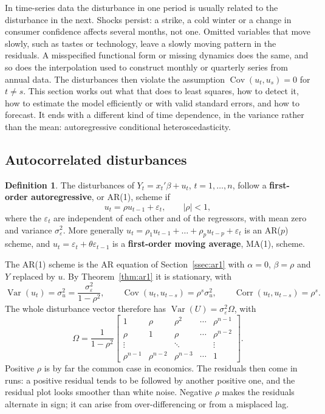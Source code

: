 \documentclass[11pt,a4paper]{article}
\numberwithin{equation}{section}
\DeclareMathOperator{\Var}{Var}
\DeclareMathOperator{\Cov}{Cov}
\DeclareMathOperator{\Corr}{Corr}
\theoremstyle{definition}
\newtheorem{defn}[thm]{Definition}
\begin{document}
In time-series data the disturbance in one period is usually related to the disturbance in the next. Shocks persist: a strike, a cold winter or a
change in consumer confidence affects several months, not one. Omitted variables that move slowly, such as tastes or technology, leave a slowly
moving pattern in the residuals. A misspecified functional form or missing dynamics does the same, and so does the interpolation used to construct
monthly or quarterly series from annual data. The disturbances then violate the assumption $\Cov(u_t, u_s) = 0$ for $t \neq s$. This section works out
what that does to least squares, how to detect it, how to estimate the model efficiently or with valid standard errors, and how to forecast. It
ends with a different kind of time dependence, in the variance rather than the mean: autoregressive conditional heteroscedasticity.

\subsection{Autocorrelated disturbances}
\label{ssec:acdist}

\begin{defn}
The disturbances of $Y_t = x_t'\beta + u_t$, $t = 1, \dots, n$, follow a \textbf{first-order autoregressive}, or AR(1), scheme if
\[
u_t = \rho u_{t-1} + \varepsilon_t, \qquad |\rho| < 1,
\]
where the $\varepsilon_t$ are independent of each other and of the regressors, with mean zero and variance $\sigma_\varepsilon^2$. More generally
$u_t = \rho_1u_{t-1} + \dots + \rho_pu_{t-p} + \varepsilon_t$ is an AR($p$) scheme, and $u_t = \varepsilon_t + \theta\varepsilon_{t-1}$ is a \textbf{first-order moving
average}, MA(1), scheme.
\end{defn}

The AR(1) scheme is the AR equation of Section~\ref{ssec:ar1} with $\alpha = 0$, $\beta = \rho$ and $Y$ replaced by $u$. By Theorem~\ref{thm:ar1} it is stationary,
with
\[
\Var(u_t) = \sigma_u^2 = \frac{\sigma_\varepsilon^2}{1 - \rho^2}, \qquad \Cov(u_t, u_{t-s}) = \rho^s\sigma_u^2, \qquad \Corr(u_t, u_{t-s}) = \rho^s .
\]
The whole disturbance vector therefore has $\Var(U) = \sigma_\varepsilon^2\Omega$, with
\begin{equation}
\label{eq:omegaar1}
\Omega = \frac{1}{1 - \rho^2}
\begin{bmatrix}
1 & \rho & \rho^2 & \cdots & \rho^{n-1}\\
\rho & 1 & \rho & \cdots & \rho^{n-2}\\
\vdots & & \ddots & & \vdots\\
\rho^{n-1} & \rho^{n-2} & \rho^{n-3} & \cdots & 1
\end{bmatrix} .
\end{equation}
Positive $\rho$ is by far the common case in economics. The residuals then come in runs: a positive residual tends to be followed by another positive
one, and the residual plot looks smoother than white noise. Negative $\rho$ makes the residuals alternate in sign; it can arise from over-differencing or
from a misplaced lag.
\end{document}

